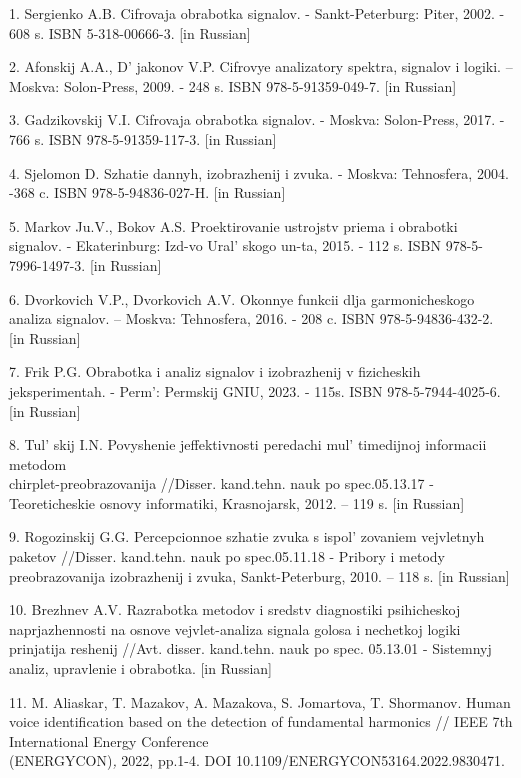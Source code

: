 \begin{references}
1. Sergienko A.B. Cifrovaja obrabotka signalov. - Sankt-Peterburg: Piter,
2002. - 608 s. ISBN 5-318-00666-3. {[}in Russian{]}

2. Afonskij A.A., D' jakonov V.P. Cifrovye analizatory
spektra, signalov i logiki. -- Moskva: Solon-Press, 2009. - 248 s. ISBN
978-5-91359-049-7. {[}in Russian{]}

3. Gadzikovskij V.I. Cifrovaja obrabotka signalov. - Moskva: Solon-Press,
2017. - 766 s. ISBN 978-5-91359-117-3. {[}in Russian{]}

4. Sjelomon D. Szhatie dannyh, izobrazhenij i zvuka. - Moskva:
Tehnosfera, 2004. -368 c. ISBN 978-5-94836-027-H. {[}in Russian{]}

5. Markov Ju.V., Bokov A.S. Proektirovanie ustrojstv priema i obrabotki
signalov. - Ekaterinburg: Izd-vo Ural' skogo un-ta, 2015.
- 112 s. ISBN 978-5-7996-1497-3. {[}in Russian{]}

6. Dvorkovich V.P., Dvorkovich A.V. Okonnye funkcii dlja garmonicheskogo
analiza signalov. -- Moskva: Tehnosfera, 2016. - 208 c. ISBN
978-5-94836-432-2. {[}in Russian{]}

7. Frik P.G. Obrabotka i analiz signalov i izobrazhenij v fizicheskih
jeksperimentah. - Perm': Permskij GNIU, 2023. - 115s.
ISBN 978-5-7944-4025-6. {[}in Russian{]}

8. Tul' skij I.N. Povyshenie jeffektivnosti peredachi
mul' timedijnoj informacii metodom\\
chirplet-preobrazovanija //Disser. kand.tehn. nauk po spec.05.13.17 -
Teoreticheskie osnovy informatiki, Krasnojarsk, 2012. -- 119 s. {[}in
Russian{]}

9. Rogozinskij G.G. Percepcionnoe szhatie zvuka s
ispol' zovaniem vejvletnyh paketov //Disser. kand.tehn.
nauk po spec.05.11.18 - Pribory i metody preobrazovanija izobrazhenij i
zvuka, Sankt-Peterburg, 2010. -- 118 s. {[}in Russian{]}

10. Brezhnev A.V. Razrabotka metodov i sredstv diagnostiki psihicheskoj
naprjazhennosti na osnove vejvlet-analiza signala golosa i nechetkoj
logiki prinjatija reshenij //Avt. disser. kand.tehn. nauk po spec.
05.13.01 - Sistemnyj analiz, upravlenie i obrabotka. {[}in Russian{]}

11. M. Aliaskar, T. Mazakov, A. Mazakova, S. Jomartova, T. Shormanov.
Human voice identification based on the detection of fundamental
harmonics // IEEE 7th International Energy Conference\\
(ENERGYCON)\emph{,} 2022, pp.1-4. DOI
10.1109/ENERGYCON53164.2022.9830471.


\end{references}
